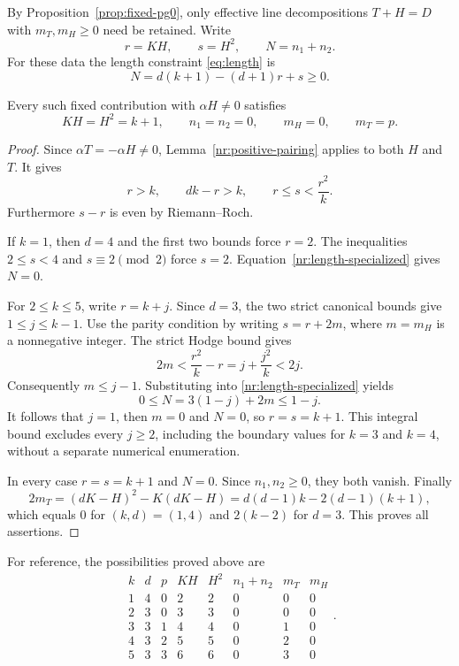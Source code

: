 By Proposition~\ref{prop:fixed-pg0}, only effective line decompositions
$T+H=D$ with $m_T,m_H\geq0$ need be retained.  Write
\[
 r=KH,\qquad s=H^2,\qquad N=n_1+n_2.
\]
For these data the length constraint \eqref{eq:length} is
\begin{equation}\label{nr:length-specialized}
 N=d(k+1)-(d+1)r+s\geq0.
\end{equation}

\begin{lemma}\label{nr:surviving-numerics}
Every such fixed contribution with $\alpha H\ne0$ satisfies
\begin{equation}\label{nr:survivors}
 KH=H^2=k+1,\qquad
 n_1=n_2=0,\qquad m_H=0,\qquad m_T=p.
\end{equation}
\end{lemma}

\begin{proof}
Since $\alpha T=-\alpha H\ne0$, Lemma~\ref{nr:positive-pairing}
applies to both $H$ and $T$.  It gives
\[
 r>k,\qquad dk-r>k,\qquad r\leq s<\frac{r^2}{k}.
\]
Furthermore $s-r$ is even by Riemann--Roch.

If $k=1$, then $d=4$ and the first two bounds force $r=2$.
The inequalities $2\leq s<4$ and $s\equiv2\pmod2$ force $s=2$.
Equation~\eqref{nr:length-specialized} gives $N=0$.

For $2\leq k\leq5$, write $r=k+j$.  Since $d=3$, the two strict
canonical bounds give $1\leq j\leq k-1$.  Use the parity condition
by writing $s=r+2m$, where $m=m_H$ is a nonnegative integer.
The strict Hodge bound gives
\begin{equation}\label{nr:length-bound}
 2m<\frac{r^2}{k}-r=j+\frac{j^2}{k}<2j.
\end{equation}
Consequently $m\leq j-1$.  Substituting into
\eqref{nr:length-specialized} yields
\begin{equation}\label{nr:length-parity}
 0\leq N=3(1-j)+2m\leq1-j.
\end{equation}
It follows that $j=1$, then $m=0$ and $N=0$, so $r=s=k+1$.
This integral bound excludes every $j\geq2$, including the boundary
values for $k=3$ and $k=4$, without a separate numerical enumeration.

In every case $r=s=k+1$ and $N=0$.  Since $n_1,n_2\geq0$, they
both vanish.  Finally
\[
 2m_T=(dK-H)^2-K(dK-H)
      =d(d-1)k-2(d-1)(k+1),
\]
which equals $0$ for $(k,d)=(1,4)$ and $2(k-2)$ for $d=3$.
This proves all assertions.
\end{proof}

For reference, the possibilities proved above are
\begin{equation}\label{nr:numerical-table}
\begin{array}{c|cc|cc|c|cc}
 k&d&p&KH&H^2&n_1+n_2&m_T&m_H\\\hline
 1&4&0&2&2&0&0&0\\
 2&3&0&3&3&0&0&0\\
 3&3&1&4&4&0&1&0\\
 4&3&2&5&5&0&2&0\\
 5&3&3&6&6&0&3&0
\end{array}.
\end{equation}

